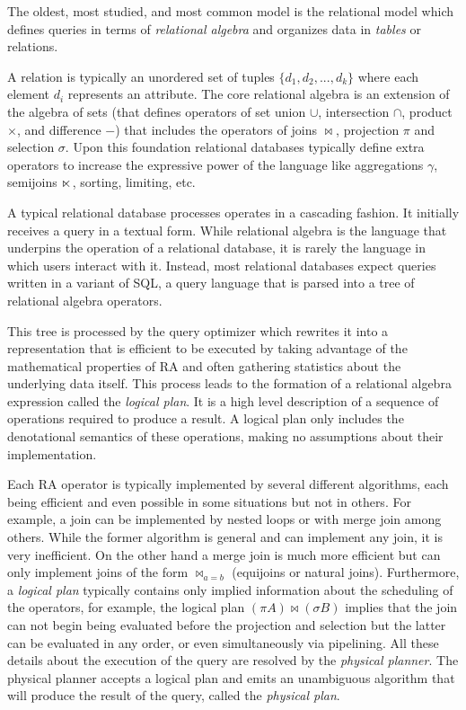 The oldest, most studied, and most common model is the relational model
which defines queries in terms of \emph{relational algebra} and organizes
data in \emph{tables} or relations.

A relation is typically an unordered set of tuples
\(\{d_1,d_2,...,d_k\}\) where each element \(d_i\) represents an
attribute. The core relational algebra is an extension of the algebra
of sets (that defines operators of set union \(\cup\), intersection
\(\cap\), product \(\times\), and difference \(-\)) that includes the
operators of joins \(\Join\), projection \(\pi\) and selection
\(\sigma\). Upon this foundation relational databases typically define
extra operators to increase the expressive power of the language like
aggregations \(\gamma\), semijoins \(\ltimes\), sorting, limiting, etc.

A typical relational database processes operates in a cascading
fashion. It initially receives a query in a textual form. While
relational algebra is the language that underpins the operation of a
relational database, it is rarely the language in which users interact
with it. Instead, most relational databases expect queries written in a
variant of SQL, a query language that is parsed into a tree of
relational algebra operators.

This tree is processed by the query optimizer which rewrites it into a
representation that is efficient to be executed by taking advantage
of the mathematical properties of RA and often gathering statistics
about the underlying data itself. This process leads to the formation
of a relational algebra expression called the \emph{logical plan}. It
is a high level description of a sequence of operations required to
produce a result. A logical plan only includes the denotational
semantics of these operations, making no assumptions about their
implementation.

Each RA operator is typically implemented by several different
algorithms, each being efficient and even possible in some situations
but not in others. For example, a join can be implemented by nested
loops or with merge join among others.  While the former algorithm is
general and can implement any join, it is very inefficient. On the
other hand a merge join is much more efficient but can only implement
joins of the form \(\Join_{a=b}\) (equijoins or natural
joins). Furthermore, a \emph{logical plan} typically contains only
implied information about the scheduling of the operators, for
example, the logical plan \((\pi A) \Join (\sigma B)\) implies that
the join can not begin being evaluated before the projection and
selection but the latter can be evaluated in any order, or even
simultaneously via pipelining. All these details about the execution
of the query are resolved by the \emph{physical planner}. The physical
planner accepts a logical plan and emits an unambiguous algorithm that
will produce the result of the query, called the \emph{physical plan}.


